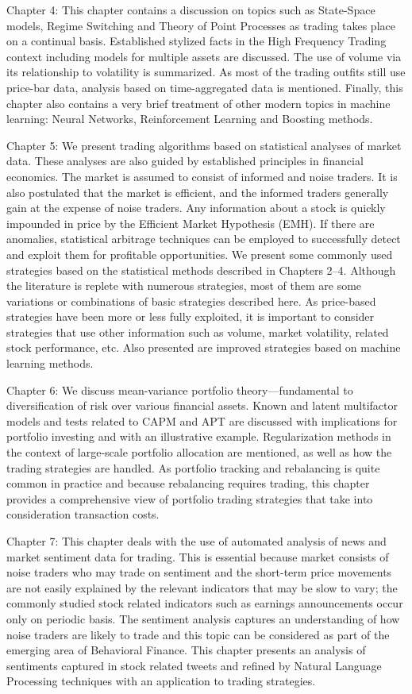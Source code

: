 Chapter 4: This chapter contains a discussion on topics such as State-Space models, Regime Switching and Theory of Point Processes as trading takes place on a continual basis. Established stylized facts in the High Frequency Trading context including models for multiple assets are discussed. The use of volume via its relationship to volatility is summarized. As most of the trading outfits still use price-bar data, analysis based on time-aggregated data is mentioned. Finally, this chapter also contains a very brief treatment of other modern topics in machine learning: Neural Networks, Reinforcement Learning and Boosting methods.
 
 
Chapter 5: We present trading algorithms based on statistical analyses of market data. These analyses are also guided by established principles in financial economics. The market is assumed to consist of informed and noise traders. It is also postulated that the market is efficient, and the informed traders generally gain at the expense of noise traders. Any information about a stock is quickly impounded in price by the Efficient Market Hypothesis (EMH). If there are anomalies, statistical arbitrage techniques can be employed to successfully detect and exploit them for profitable opportunities. We present some commonly used strategies based on the statistical methods described in Chapters 2--4. Although the literature is replete with numerous strategies, most of them are some variations or combinations of basic strategies described here. As price-based strategies have been more or less fully exploited, it is important to consider strategies that use other information such as volume, market volatility, related stock performance, etc. Also presented are improved strategies based on machine learning methods.


Chapter 6: We discuss mean-variance portfolio theory---fundamental to diversification of risk over various financial assets. Known and latent multifactor models and tests related to CAPM and APT are discussed with implications for portfolio investing and with an illustrative example. Regularization methods in the context of large-scale portfolio allocation are mentioned, as well as how the trading strategies are handled. As portfolio tracking and rebalancing is quite common in practice and because rebalancing requires trading, this chapter provides a comprehensive view of portfolio trading strategies that take into consideration transaction costs.  


Chapter 7: This chapter deals with the use of automated analysis of news and market sentiment data for trading. This is essential because market consists of noise traders who may trade on sentiment and the short-term price movements are not easily explained by the relevant indicators that may be slow to vary; the commonly studied stock related indicators such as earnings announcements occur only on periodic basis. The sentiment analysis captures an understanding of how noise traders are likely to trade and this topic can be considered as part of the emerging area of Behavioral Finance. This chapter presents an analysis of sentiments captured in stock related tweets and refined by Natural Language Processing techniques with an application to trading strategies. 


